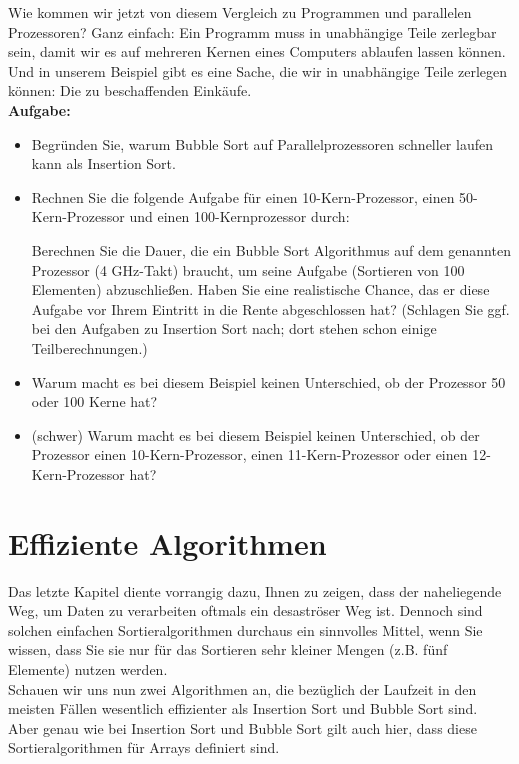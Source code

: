 Wie kommen wir jetzt von diesem Vergleich zu Programmen und parallelen Prozessoren? Ganz einfach: Ein Programm muss in unabhängige Teile zerlegbar sein, damit wir es auf mehreren Kernen eines Computers ablaufen lassen können. Und in unserem Beispiel gibt es eine Sache, die wir in unabhängige Teile zerlegen können: Die zu beschaffenden Einkäufe.\\

\textbf{Aufgabe:}

\begin{itemize}
	\item Begründen Sie, warum Bubble Sort auf Parallelprozessoren schneller laufen kann als Insertion Sort.
	\item Rechnen Sie die folgende Aufgabe für einen 10-Kern-Prozessor, einen 50-Kern-Prozessor und einen 100-Kernprozessor durch:
	
	Berechnen Sie die Dauer, die ein Bubble Sort Algorithmus auf dem genannten Prozessor (4 GHz-Takt) braucht, um seine Aufgabe (Sortieren von 100 Elementen) abzuschließen. Haben Sie eine realistische Chance, das er diese Aufgabe vor Ihrem Eintritt in die Rente abgeschlossen hat? (Schlagen Sie ggf. bei den Aufgaben zu Insertion Sort nach; dort stehen schon einige Teilberechnungen.)
	
	\item Warum macht es bei diesem Beispiel keinen Unterschied, ob der Prozessor 50 oder 100 Kerne hat?
	\item (schwer) Warum macht es bei diesem Beispiel keinen Unterschied, ob der Prozessor einen 10-Kern-Prozessor, einen 11-Kern-Prozessor oder einen 12-Kern-Prozessor hat?
\end{itemize}

\chapter{Effiziente Algorithmen}

Das letzte Kapitel diente vorrangig dazu, Ihnen zu zeigen, dass der naheliegende Weg, um Daten zu verarbeiten oftmals ein desaströser Weg ist. Dennoch sind solchen einfachen Sortieralgorithmen durchaus ein sinnvolles Mittel, wenn Sie wissen, dass Sie sie nur für das Sortieren sehr kleiner Mengen (z.B. fünf Elemente) nutzen werden.\\

Schauen wir uns nun zwei Algorithmen an, die bezüglich der Laufzeit in den meisten Fällen wesentlich effizienter als Insertion Sort und Bubble Sort sind. Aber genau wie bei Insertion Sort und Bubble Sort gilt auch hier, dass diese Sortieralgorithmen für Arrays definiert sind.